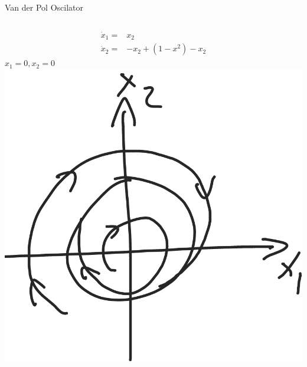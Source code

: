 \documentclass{beamer}
\begin{document}
\begin{frame}{Van der Pol Oscilator}
    \begin{columns}[T]
    \begin{align*}
        \dot{x}_1 =& x_2\\
        \dot{x}_2 =& -x_2+(1-x^2)-x_2
    \end{align*}
    $x_1=0,x_2=0$
    \vspace{1cm}
        \vspace{-1cm}
        \includegraphics[width=\textwidth]{fig/limitCircle.png}   
    \end{columns}
\end{frame}
\end{document}

